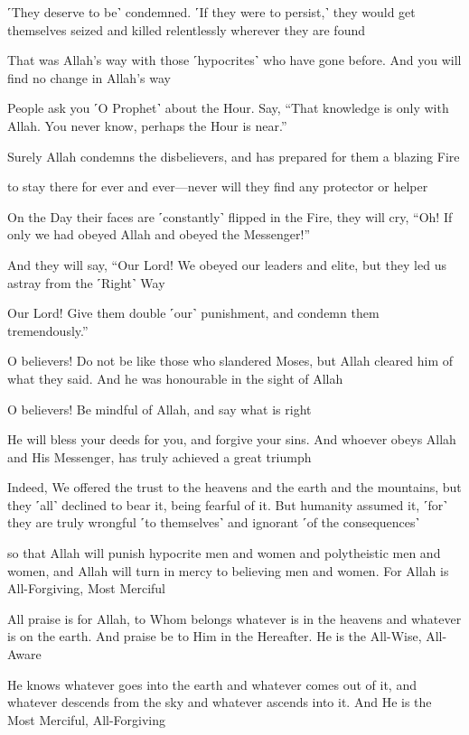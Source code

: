 ˹They deserve to be˺ condemned. ˹If they were to persist,˺ they would get themselves seized and killed relentlessly wherever they are found

That was Allah’s way with those ˹hypocrites˺ who have gone before. And you will find no change in Allah’s way

People ask you ˹O Prophet˺ about the Hour. Say, “That knowledge is only with Allah. You never know, perhaps the Hour is near.”

Surely Allah condemns the disbelievers, and has prepared for them a blazing Fire

to stay there for ever and ever—never will they find any protector or helper

On the Day their faces are ˹constantly˺ flipped in the Fire, they will cry, “Oh! If only we had obeyed Allah and obeyed the Messenger!”

And they will say, “Our Lord! We obeyed our leaders and elite, but they led us astray from the ˹Right˺ Way

Our Lord! Give them double ˹our˺ punishment, and condemn them tremendously.”

O believers! Do not be like those who slandered Moses, but Allah cleared him of what they said. And he was honourable in the sight of Allah

O believers! Be mindful of Allah, and say what is right

He will bless your deeds for you, and forgive your sins. And whoever obeys Allah and His Messenger, has truly achieved a great triumph

Indeed, We offered the trust to the heavens and the earth and the mountains, but they ˹all˺ declined to bear it, being fearful of it. But humanity assumed it, ˹for˺ they are truly wrongful ˹to themselves˺ and ignorant ˹of the consequences˺

so that Allah will punish hypocrite men and women and polytheistic men and women, and Allah will turn in mercy to believing men and women. For Allah is All-Forgiving, Most Merciful

All praise is for Allah, to Whom belongs whatever is in the heavens and whatever is on the earth. And praise be to Him in the Hereafter. He is the All-Wise, All-Aware

He knows whatever goes into the earth and whatever comes out of it, and whatever descends from the sky and whatever ascends into it. And He is the Most Merciful, All-Forgiving

